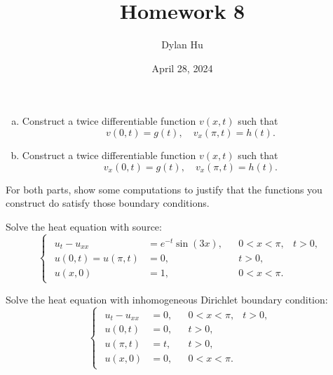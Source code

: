 \documentclass[plain]{pset}
\title{Homework 8}
\author{Dylan Hu}
\date{April 28, 2024}
\begin{document}
\maketitle

\pagebreak

\begin{problem}
\leavevmode
\begin{enumerate}[(a)]
    \item Construct a twice differentiable function \(v(x,t)\) such that
          \[v(0,t) = g(t), \quad v_x(\pi, t) = h(t).\]
    \item Construct a twice differentiable function \(v(x,t)\) such that
          \[v_x(0,t) = g(t), \quad v_x(\pi, t) = h(t).\]
\end{enumerate}
For both parts, show some computations to justify that the functions you construct do
satisfy those boundary conditions.
\end{problem}
\begin{solution}

\end{solution}

\pagebreak

\begin{problem}
Solve the heat equation with source:
\[
    \begin{cases}
        \begin{aligned}
            u_t - u_{xx}        & = e^{-t}\sin(3x), &  & 0 < x < \pi, & t > 0, \\
            u(0, t) = u(\pi, t) & = 0,              &  & t > 0,                \\
            u(x, 0)             & = 1,              &  & 0 < x < \pi.
        \end{aligned}
    \end{cases}
\]
\end{problem}
\begin{solution}

\end{solution}

\pagebreak

\begin{problem}
Solve the heat equation with inhomogeneous Dirichlet boundary condition:
\[
    \begin{cases}
        \begin{aligned}
            u_t - u_{xx} & = 0, &  & 0 < x < \pi, & t > 0, \\
            u(0, t)      & = 0, &  & t > 0,                \\
            u(\pi, t)    & = t, &  & t > 0,                \\
            u(x, 0)      & = 0, &  & 0 < x < \pi.
        \end{aligned}
    \end{cases}
\]
\end{problem}
\begin{solution}

\end{solution}
\end{document}
